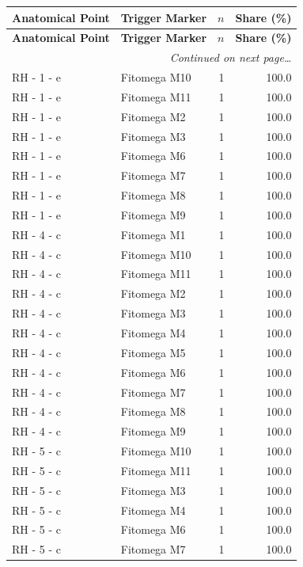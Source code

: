 \documentclass[a4paper,11pt]{article}
\begin{document}
\begin{footnotesize}
\begin{longtable}{p{3.5cm}p{7.5cm}rr}
\toprule
\textbf{Anatomical Point} &
\textbf{Trigger Marker} &
\textbf{$n$} &
\textbf{Share (\%)} \\
\midrule
\endfirsthead
\toprule
\textbf{Anatomical Point} &
\textbf{Trigger Marker} &
\textbf{$n$} &
\textbf{Share (\%)} \\
\midrule
\endhead
\midrule
\multicolumn{4}{r}{\footnotesize\emph{Continued on next page\ldots}} \\
\endfoot
\bottomrule
\endlastfoot
RH - 1 - e & Fitomega M10 & 1 & 100.0 \\
RH - 1 - e & Fitomega M11 & 1 & 100.0 \\
RH - 1 - e & Fitomega M2 & 1 & 100.0 \\
RH - 1 - e & Fitomega M3 & 1 & 100.0 \\
RH - 1 - e & Fitomega M6 & 1 & 100.0 \\
RH - 1 - e & Fitomega M7 & 1 & 100.0 \\
RH - 1 - e & Fitomega M8 & 1 & 100.0 \\
RH - 1 - e & Fitomega M9 & 1 & 100.0 \\
RH - 4 - c & Fitomega M1 & 1 & 100.0 \\
RH - 4 - c & Fitomega M10 & 1 & 100.0 \\
RH - 4 - c & Fitomega M11 & 1 & 100.0 \\
RH - 4 - c & Fitomega M2 & 1 & 100.0 \\
RH - 4 - c & Fitomega M3 & 1 & 100.0 \\
RH - 4 - c & Fitomega M4 & 1 & 100.0 \\
RH - 4 - c & Fitomega M5 & 1 & 100.0 \\
RH - 4 - c & Fitomega M6 & 1 & 100.0 \\
RH - 4 - c & Fitomega M7 & 1 & 100.0 \\
RH - 4 - c & Fitomega M8 & 1 & 100.0 \\
RH - 4 - c & Fitomega M9 & 1 & 100.0 \\
RH - 5 - c & Fitomega M10 & 1 & 100.0 \\
RH - 5 - c & Fitomega M11 & 1 & 100.0 \\
RH - 5 - c & Fitomega M3 & 1 & 100.0 \\
RH - 5 - c & Fitomega M4 & 1 & 100.0 \\
RH - 5 - c & Fitomega M6 & 1 & 100.0 \\
RH - 5 - c & Fitomega M7 & 1 & 100.0 \\

\end{longtable}
\end{footnotesize}
\end{document}
